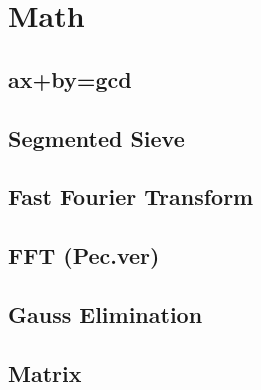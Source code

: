 \documentclass[a4paper,10pt,twocolumn,oneside]{article}
\begin{document}
%

\section{Math}
\subsection{ax+by=gcd}


\subsection{Segmented Sieve}


%

\subsection{Fast Fourier Transform}


\subsection{FFT (Pec.ver)}


\subsection{Gauss Elimination}


\subsection{Matrix}


%
\end{document}
